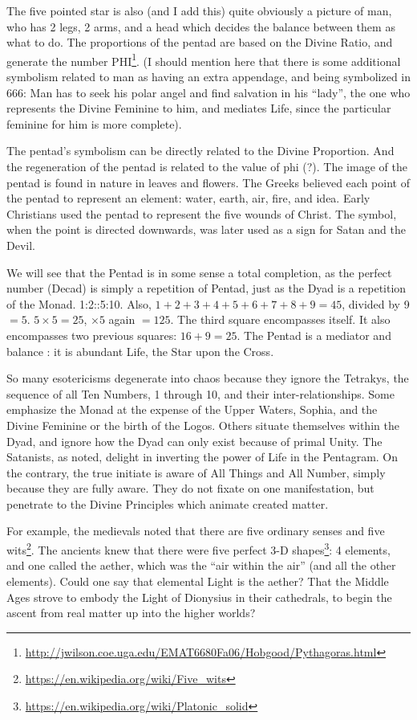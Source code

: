 The five pointed star is also (and I add this) quite obviously a picture of man, who has 2 legs, 2 arms, and a head which decides the balance between them as what to do. The proportions of the pentad are based on the Divine Ratio, and generate the number PHI\footnote{\url{http://jwilson.coe.uga.edu/EMAT6680Fa06/Hobgood/Pythagoras.html}}. (I should mention here that there is some additional symbolism related to man as having an extra appendage, and being symbolized in 666: Man has to seek his polar angel and find salvation in his ``lady'', the one who represents the Divine Feminine to him, and mediates Life, since the particular feminine for him is more complete).

\begin{quotex}
The pentad's symbolism can be directly related to the Divine Proportion. And the regeneration of the pentad is related to the value of phi (?). The image of the pentad is found in nature in leaves and flowers. The Greeks believed each point of the pentad to represent an element: water, earth, air, fire, and idea. Early Christians used the pentad to represent the five wounds of Christ. The symbol, when the point is directed downwards, was later used as a sign for Satan and the Devil.
\end{quotex}


We will see that the Pentad is in some sense a total completion, as the perfect number (Decad) is simply a repetition of Pentad, just as the Dyad is a repetition of the Monad. 1:2::5:10. Also, $1+2+3+4+5+6+7+8+9= 45$, divided by 9 $= 5$. $5\times 5=25$, $\times 5$ again $= 125$. The third square encompasses itself. It also encompasses two previous squares: $16+9=25$. The Pentad is a mediator and balance : it is abundant Life, the Star upon the Cross.

So many esotericisms degenerate into chaos because they ignore the Tetrakys, the sequence of all Ten Numbers, 1 through 10, and their inter-relationships. Some emphasize the Monad at the expense of the Upper Waters, Sophia, and the Divine Feminine or the birth of the Logos. Others situate themselves within the Dyad, and ignore how the Dyad can only exist because of primal Unity. The Satanists, as noted, delight in inverting the power of Life in the Pentagram. On the contrary, the true initiate is aware of All Things and All Number, simply because they are fully aware. They do not fixate on one manifestation, but penetrate to the Divine Principles which animate created matter.

For example, the medievals noted that there are five ordinary senses and five wits\footnote{\url{https://en.wikipedia.org/wiki/Five\_wits}}. The ancients knew that there were five perfect 3-D shapes\footnote{\url{https://en.wikipedia.org/wiki/Platonic\_solid}}: 4 elements, and one called the aether, which was the ``air within the air'' (and all the other elements). Could one say that elemental Light is the aether? That the Middle Ages strove to embody the Light of Dionysius in their cathedrals, to begin the ascent from real matter up into the higher worlds?


